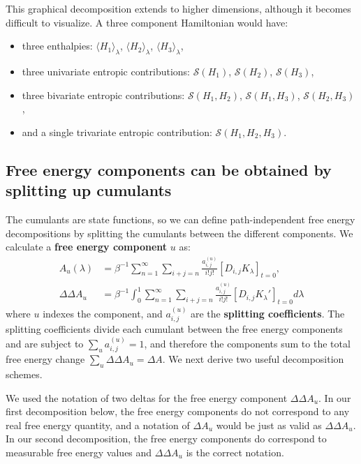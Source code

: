 \documentclass{article}
\begin{document}
This graphical decomposition extends to higher dimensions, although it becomes difficult to visualize. A three component Hamiltonian would have:
\begin{itemize}
	\item three enthalpies: $\langle H_1 \rangle_\lambda$, $\langle H_2 \rangle_\lambda$, $\langle H_3 \rangle_\lambda$,
	\item three univariate entropic contributions: $\mathcal{S}(H_1)$, $\mathcal{S}(H_2)$, $\mathcal{S}(H_3)$,
	\item three bivariate entropic contributions: $\mathcal{S}(H_1, H_2)$, $\mathcal{S}(H_1, H_3)$, $\mathcal{S}(H_2, H_3)$, 
	\item and a single trivariate entropic contribution: $\mathcal{S}(H_1, H_2, H_3)$.
\end{itemize}


\subsection{Free energy components can be obtained by splitting up cumulants}

The cumulants are state functions, so we can define path-independent free energy decompositions by splitting the cumulants between the different components. We calculate a \textbf{free energy component} $u$ as: 
\begin{align}
 A_u(\lambda) &=
	\beta^{-1} \sum_{n=1}^{\infty}
	\sum_{i+j=n}
	\frac{a_{i,j}^{(u)}}{i!j!}\left[ D_{i,j} K_\lambda\right]_{t=0},
\nonumber \\ 
\Delta \Delta A_u &= \beta^{-1} \int_0^1 \sum_{n=1}^{\infty}
	\sum_{i+j=n}
	\frac{a_{i,j}^{(u)}}{i!j!}
    	\left[ D_{i,j} K_\lambda' \right]_{t=0} d\lambda
\label{eq:Components}
\end{align}
where $u$ indexes the component, and $a_{i,j}^{(u)}$ are the \textbf{splitting coefficients}. The splitting coefficients divide each cumulant between the free energy components and are subject to $\sum_u a_{i,j}^{(u)}=1$, and therefore the components sum to the total free energy change $\sum_u \Delta \Delta A_u = \Delta A$. We next derive two useful decomposition schemes. 

We used the notation of two deltas for the free energy component $\Delta \Delta A_u$. In our first decomposition below, the free energy components do not correspond to any real free energy quantity, and a notation of $\Delta A_u$ would be just as valid as $\Delta \Delta A_u$. In our second decomposition, the free energy components do correspond to measurable free energy values and $\Delta \Delta A_u$ is the correct notation. 
\end{document}
